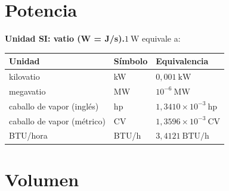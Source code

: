 \documentclass[12pt, letterpaper]{article}
\begin{document}
\section{Potencia}

\begin{cuadroteoria}
    \textbf{Unidad SI: vatio (W = J/s).}\quad $1\ \text{W}$ equivale a:
    \begin{center}
        \begin{tabular}{lll}
            \toprule
            \textbf{Unidad}            & \textbf{Símbolo} & \textbf{Equivalencia}                \\
            \midrule
            kilovatio                  & kW               & $0{,}001\ \text{kW}$                 \\
            megavatio                  & MW               & $10^{-6}\ \text{MW}$                 \\
            caballo de vapor (inglés)  & hp               & $1{,}3410 \times 10^{-3}\ \text{hp}$ \\
            caballo de vapor (métrico) & CV               & $1{,}3596 \times 10^{-3}\ \text{CV}$ \\
            BTU/hora                   & BTU/h            & $3{,}4121\ \text{BTU/h}$             \\
            \bottomrule
        \end{tabular}
    \end{center}
\end{cuadroteoria}
\newpage
\section{Volumen}
\end{document}
